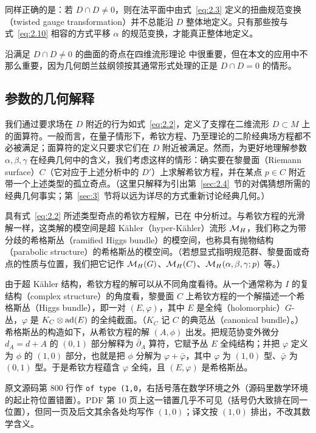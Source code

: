 同样正确的是：若 $D\cap D\not= 0$，则在法平面中由式~\eqref{eq:2.3} 定义的扭曲规范变换（twisted gauge transformation）并不总能沿 $D$ 整体地定义。只有那些按与式~\eqref{eq:2.10} 相容的方式平移 $\alpha$ 的规范变换，才能真正整体地定义。

沿满足 $D\cap D\not=0$ 的曲面的奇点在四维流形理论 \cite{ref11} 中很重要，但在本文的应用中不那么重要，因为几何朗兰兹纲领按其通常形式处理的正是 $D\cap D=0$ 的情形。

\subsection{参数的几何解释}

\label{sec:2.2}

我们通过要求场在 $D$ 附近的行为如式~\eqref{eq:2.2}，定义了支撑在二维流形 $D\subset M$ 上的面算符。一般而言，在量子情形下，希钦方程、乃至理论的二阶经典场方程都不必被满足；面算符的定义只要求它们在 $D$ 附近被满足。然而，为更好地理解参数 $\alpha,\beta,\gamma$ 在经典几何中的含义，我们考虑这样的情形：确实要在黎曼面（Riemann surface）$C$（它对应于上述分析中的 $D'$）上求解希钦方程，并在某点 $p\in C$ 附近带一个上述类型的孤立奇点。（这里只解释为引出第~\ref{sec:2.4}~节的对偶猜想所需的经典几何事实；第~\ref{sec:3}~节将以远为详尽的方式重新讨论经典几何。）

具有式~\eqref{eq:2.2} 所述类型奇点的希钦方程解，已在 \cite{ref22,ref23,ref24} 中分析过。与希钦方程的光滑解一样，这类解的模空间是超 Kähler（hyper-Kähler）流形 $\mathcal{M}_H$，我们称之为带分歧的希格斯丛（ramified Higgs bundle）的模空间，也称具有抛物结构（parabolic structure）的希格斯丛的模空间。（若想显式指明规范群、黎曼面或奇点的性质与位置，我们把它记作 $\mathcal{M}_H(G)$、$\mathcal{M}_H(C)$、$\mathcal{M}_H(\alpha,\beta,\gamma;p)$ 等。）

由于超 Kähler 结构，希钦方程的解可以从不同角度看待。从一个通常称为 $I$ 的复结构（complex structure）的角度看，黎曼面 $C$ 上希钦方程的一个解描述一个希格斯丛（Higgs bundle），即一对 $(E,\varphi)$，其中 $E$ 是全纯（holomorphic）$G$-丛，$\varphi$ 是 $K_C\otimes
{\rm ad}(E)$ 的全纯截面。（$K_C$ 记 $C$ 的典范丛（canonical bundle）。）希格斯丛的构造如下，从希钦方程的解 $(A,\phi)$ 出发。把规范协变外微分 $d_A=d+A$ 的 $(0,1)$ 部分解释为 $\bar\partial_A$ 算符，它赋予丛 $E$ 全纯结构；并把 $\varphi$ 定义为 $\phi$ 的 $(1,0)$ 部分，也就是把 $\phi$ 分解为 $\varphi+\bar\varphi$，其中 $\varphi$ 为 $(1,0)$ 型、$\bar\varphi$ 为 $(0,1)$ 型。于是希钦方程蕴含 $\varphi$ 全纯，且 $(E,\varphi)$ 是希格斯丛。
\begin{yizhu}[原文疑误]
原文源码第 800 行作 \texttt{of type (1,0}，右括号落在数学环境之外（源码里数学环境的起止符位置错置）。PDF 第 10 页上这一错置几乎不可见（括号仍大致排在同一位置），但同一页及后文其余各处均写作 $(1,0)$；译文按 $(1,0)$ 排出，不改其数学含义。
\end{yizhu}

